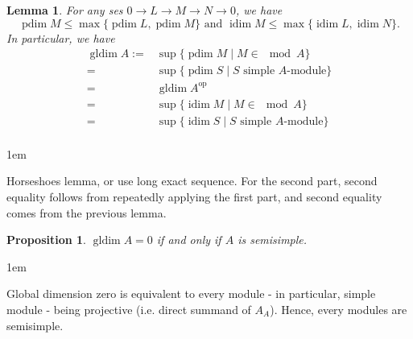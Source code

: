 \documentclass[11pt,a4paper]{article}
\makeatletter
\numberwithin{equation}{section}
\renewenvironment{proof}[1][\proofname]{\par
    \pushQED{\qed}%
    \normalfont \topsep0\p@\@plus6\p@ \labelsep1em\relax
    \trivlist
    \item[\hskip\labelsep\indent
        \bfseries #1]\ignorespaces
    \mbox{}
}{
    \popQED\endtrivlist\@endpefalse
}
\theoremstyle{all}
\newtheorem{proposition}[theorem]{Proposition}
\newtheorem{lemma}[theorem]{Lemma}
\theoremstyle{remark}
\newcommand{\op}{\mathrm{op}}
\newcommand{\pdim}{\operatorname{pdim}}
\newcommand{\idim}{\operatorname{idim}}
\newcommand{\gldim}{\operatorname{gldim}\nolimits}
\makeatother
\begin{document}
\begin{lemma}\label{lem:bdd pdim idim by ses}
For any ses $0\to L\to M\to N\to 0$, we have 
\[
\pdim M\leq \max\{\pdim L,\pdim M\} \text{ and } \idim M\leq \max\{\idim L,\idim N\}.
\]
In particular, we have
\begin{align*}
\gldim A :=& \sup\{\pdim M\mid M\in \mod A\} \\
= &\sup\{\pdim S\mid S\text{ simple $A$-module}\}\\
= &\gldim A^\op\\
= &\sup\{\idim M\mid M\in \mod A\}\\
= &\sup\{\idim S\mid S\text{ simple $A$-module}\}\\
\end{align*}
\end{lemma}
\begin{proof}
Horseshoes lemma, or use long exact sequence.
For the second part, second equality follows from repeatedly applying the first part, and second equality comes from the previous lemma.
\end{proof}

\begin{proposition}
$\gldim A=0$ if and only if $A$ is semisimple.
\end{proposition}
\begin{proof}
Global dimension zero is equivalent to every module - in particular, simple module - being projective (i.e. direct summand of $A_A$).  Hence, every modules are semisimple.
\end{proof}
\end{document}
